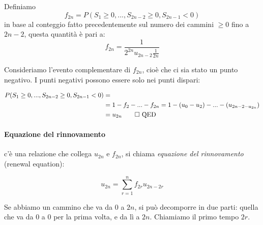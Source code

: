 \documentclass[a4paper,12pt]{book}
\begin{document}
Definiamo 
$$ f_{2n} = P(S_1 \ge 0, ..., S_{2n-2} \ge 0, S_{2n-1} < 0) $$
in base al conteggio fatto precedentemente sul numero dei cammini $ \ge 0 $ fino a $ 2n-2 $, questa quantità è pari a:
$$  f_{2n} = \frac{1}{2^{2n} u_{2n-2} \frac{1}{2n}} $$

Consideriamo l'evento complementare di $ f_{2n} $, cioè che ci sia stato un punto negativo. I punti negativi possono essere solo nei punti dispari:

\begin{align*}
 P(S_1 \ge 0, ..., S_{2n-2} \ge 0, S_{2n-1} < 0) & = \\
 & = 1 - f_2 - ... - f_{2n} = 1 - (u_0 - u_2) - ... - (u_{2n-2 - u_{2n}}) \\
 & = u_{2n} \qed \text{ QED }
\end{align*}

\paragraph{Equazione del rinnovamento} c'è una relazione che collega $ u_{2n} $ e $ f_{2n} $, si chiama \textit{equazione del rinnovamento} (renewal equation):

$$ u_{2n} = \sum_{r = 1}^{n} f_{2r} u_{2n-2r} $$

\begin{multicols}{2}
	Se abbiamo un cammino che va da 0 a $ 2n $, si può decomporre in due parti: quella che va da 0 a 0 per la prima volta, e da lì a $ 2n $. Chiamiamo il primo tempo $ 2r $. 
	
	
\end{multicols}
\end{document}
